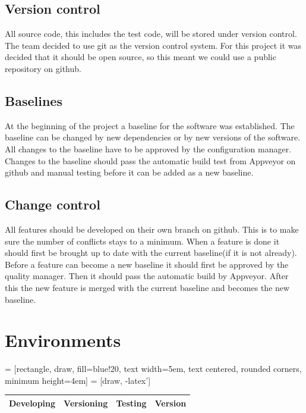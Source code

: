 \documentclass[12pt]{article}
\begin{document}
	\subsection{Version control}

	All source code, this includes the test code, will be stored under version control. The team decided to use \gls{git} as the version control system. For this project it was decided that it should be open source, so this meant we could use a public repository on \gls{github}.

	\subsection{Baselines}

	At the beginning of the project a baseline for the software was established. The baseline can be changed by new dependencies or by new versions of the software. All changes to the baseline have to be approved by the configuration manager. \\
	Changes to the baseline should pass the automatic build test from \gls{Appveyor} on \gls{github} and manual testing before it can be added as a new baseline.

	\subsection{Change control}

	All features should be developed on their own branch on \gls{github}. This is to make sure the number of conflicts stays to a minimum. When a feature is done it should first be brought up to date with the current baseline(if it is not already). Before a feature can become a new baseline it should first be approved by the quality manager. Then it should pass the automatic build by \gls{Appveyor}. After this the new feature is merged with the current baseline and becomes the new baseline.

	\clearpage
	\section{Environments}

	 = [rectangle, draw, fill=blue!20,
	text width=5em, text centered, rounded corners, minimum height=4em]
	 = [draw, -latex']

	\begin{table}[htbp]
		\begin{tabular}{ p{2.5cm}  p{2.5cm}  p{4.5cm}  p{3cm} }
			\textbf{Developing} & \textbf{Versioning} & \textbf{Testing} & \textbf{Version} \\ \hline
		\end{tabular}
	\end{table}
\end{document}
